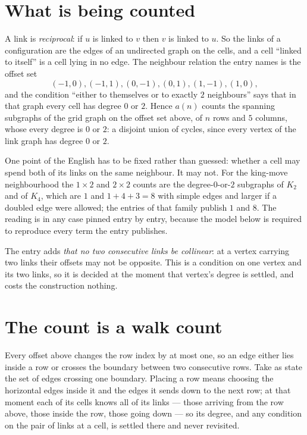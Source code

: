 \documentclass[11pt,a4paper]{article}
\theoremstyle{plain}
\theoremstyle{definition}
\begin{document}
\section{What is being counted}

A link is \emph{reciprocal}: if $u$ is linked to $v$ then $v$ is linked to $u$. So the links
of a configuration are the edges of an undirected graph on the cells, and a cell ``linked to
itself'' is a cell lying in no edge. The neighbour relation the entry names is the offset set
\[
(-1,0), (-1,1), (0,-1), (0,1), (1,-1), (1,0),
\]
and the condition ``either to themselves or to exactly $2$ neighbours'' says that in that
graph every cell has degree $0$ or $2$. Hence $a(n)$ counts the spanning subgraphs of the
grid graph on the offset set above, of $n$ rows and $5$ columns,
whose every degree is $0$ or $2$: a disjoint union of cycles, since every vertex of the link graph has degree $0$ or $2$.

One point of the English has to be fixed rather than guessed: whether a cell may spend both of
its links on the same neighbour. It may not. For the king-move neighbourhood the $1\times2$
and $2\times2$ counts are the degree-$0$-or-$2$ subgraphs of $K_2$ and of $K_4$, which are $1$
and $1+4+3=8$ with simple edges and larger if a doubled edge were allowed; the entries of that
family publish $1$ and $8$. The reading is in any case pinned entry by entry, because the
model below is required to reproduce every term the entry publishes.

The entry adds \emph{that no two consecutive links be collinear}: at a vertex carrying two
links their offsets may not be opposite. This is a condition on one vertex and its two links,
so it is decided at the moment that vertex's degree is settled, and costs the construction
nothing.

\section{The count is a walk count}

Every offset above changes the row index by at most one, so an edge either lies inside a row
or crosses the boundary between two consecutive rows. Take as state the set of edges crossing
one boundary. Placing a row means choosing the horizontal edges inside it and the edges it
sends down to the next row; at that moment each of its cells knows all of its links --- those
arriving from the row above, those inside the row, those going down --- so its degree, and any
condition on the pair of links at a cell, is settled there and never revisited.
\end{document}
